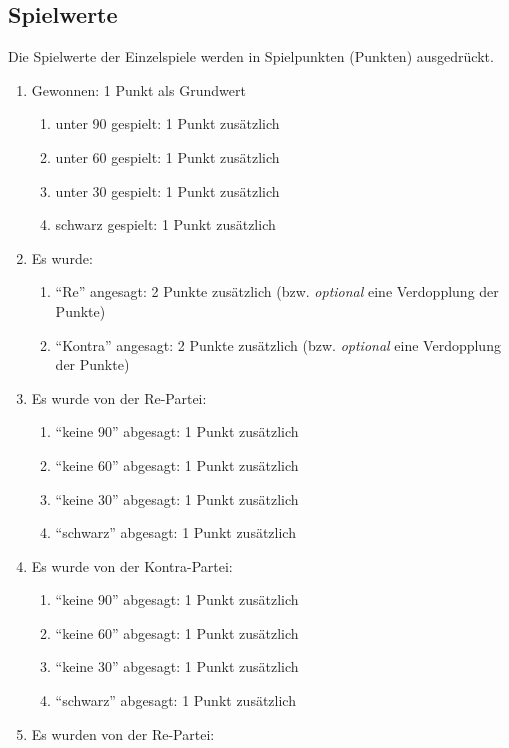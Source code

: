 \documentclass{scrartcl}
\newcommand{\optional}{\textit{optional}\xspace}
\begin{document}
\subsection{Spielwerte}

Die Spielwerte der Einzelspiele werden in Spielpunkten (Punkten) ausgedrückt.
\begin{enumerate}
  \item Gewonnen: 1 Punkt als Grundwert
    \begin{enumerate}
      \item unter 90 gespielt: 1 Punkt zusätzlich
      \item unter 60 gespielt: 1 Punkt zusätzlich
      \item unter 30 gespielt: 1 Punkt zusätzlich
      \item schwarz gespielt: 1 Punkt zusätzlich
    \end{enumerate}
  \item Es wurde:
    \begin{enumerate}
      \item "`Re"' angesagt: 2 Punkte zusätzlich (bzw. \optional eine
	Verdopplung der Punkte)
      \item "`Kontra"' angesagt: 2 Punkte zusätzlich (bzw. \optional eine
	Verdopplung der Punkte)
    \end{enumerate}
  \item Es wurde von der Re-Partei:
    \begin{enumerate}
      \item "`keine 90"' abgesagt: 1 Punkt zusätzlich
      \item "`keine 60"' abgesagt: 1 Punkt zusätzlich
      \item "`keine 30"' abgesagt: 1 Punkt zusätzlich
      \item "`schwarz"' abgesagt: 1 Punkt zusätzlich
    \end{enumerate}
  \item Es wurde von der Kontra-Partei:
    \begin{enumerate}
      \item "`keine 90"' abgesagt: 1 Punkt zusätzlich
      \item "`keine 60"' abgesagt: 1 Punkt zusätzlich
      \item "`keine 30"' abgesagt: 1 Punkt zusätzlich
      \item "`schwarz"' abgesagt: 1 Punkt zusätzlich
    \end{enumerate}
  \item Es wurden von der Re-Partei:

\end{enumerate}
\end{document}
